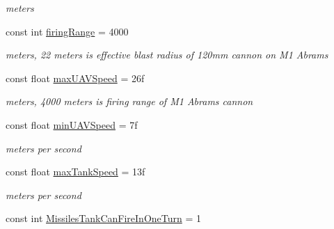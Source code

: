 \begin{DoxyCompactItemize}
\begin{DoxyCompactList}\small\item\em meters \end{DoxyCompactList}\item 
\mbox{\label{class_n_g_a_p_i_1_1_constants_a63c05d50bec436159177f4f4de9fb42f}} 
const int \hyperlink{class_n_g_a_p_i_1_1_constants_a63c05d50bec436159177f4f4de9fb42f}{firing\+Range} = 4000
\begin{DoxyCompactList}\small\item\em meters, 22 meters is effective blast radius of 120mm cannon on M1 Abrams \end{DoxyCompactList}\item 
\mbox{\label{class_n_g_a_p_i_1_1_constants_a118b1f4aacc1eb87e77f40b1f8e699f5}} 
const float \hyperlink{class_n_g_a_p_i_1_1_constants_a118b1f4aacc1eb87e77f40b1f8e699f5}{max\+U\+A\+V\+Speed} = 26f
\begin{DoxyCompactList}\small\item\em meters, 4000 meters is firing range of M1 Abrams cannon \end{DoxyCompactList}\item 
\mbox{\label{class_n_g_a_p_i_1_1_constants_a57d647623e685948202fca0699dbcf49}} 
const float \hyperlink{class_n_g_a_p_i_1_1_constants_a57d647623e685948202fca0699dbcf49}{min\+U\+A\+V\+Speed} = 7f
\begin{DoxyCompactList}\small\item\em meters per second \end{DoxyCompactList}\item 
\mbox{\label{class_n_g_a_p_i_1_1_constants_a2f562f986a0022b50dfcfb9856b6d933}} 
const float \hyperlink{class_n_g_a_p_i_1_1_constants_a2f562f986a0022b50dfcfb9856b6d933}{max\+Tank\+Speed} = 13f
\begin{DoxyCompactList}\small\item\em meters per second \end{DoxyCompactList}\item 
\mbox{\label{class_n_g_a_p_i_1_1_constants_aa01fe75059ffdb4ab337b3c1e7fe44eb}} 
const int \hyperlink{class_n_g_a_p_i_1_1_constants_aa01fe75059ffdb4ab337b3c1e7fe44eb}{Missiles\+Tank\+Can\+Fire\+In\+One\+Turn} = 1

\end{DoxyCompactItemize}
